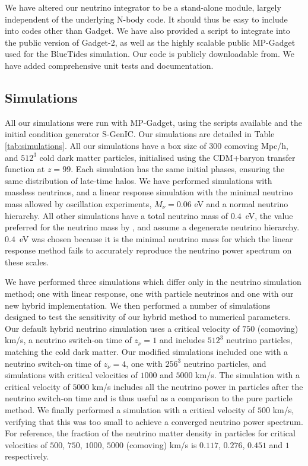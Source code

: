 \documentclass[useAMS, usenatbib]{mnras}
\begin{document}
We have altered our neutrino integrator to be a stand-alone module, largely
independent of the underlying N-body code. It should thus be easy to include
into codes other than Gadget. We have also provided a script to integrate into the
public version of Gadget-2, as well as the highly scalable public MP-Gadget
used for the BlueTides simulation. Our code is publicly downloadable from.
We have added comprehensive unit tests and documentation.

\subsection{Simulations}
\label{sec:simulations}

All our simulations were run with MP-Gadget, using the scripts available
and the initial condition generator S-GenIC. Our simulations are detailed in Table \ref{tab:simulations}.
All our simulations have a box size of $300$ comoving Mpc/h, and $512^3$ cold dark matter particles,
initialised using the CDM+baryon transfer function at $z=99$. Each simulation has the same initial phases,
ensuring the same distribution of late-time halos. We have performed simulations with massless neutrinos, and a linear response simulation with the minimal neutrino mass allowed by oscillation experiments, $M_\nu = 0.06$ eV and a normal neutrino hierarchy. All other simulations have a total neutrino mass of $0.4$~eV, the value preferred for the neutrino mass by \cite{Beutler_2014}, and assume a degenerate neutrino hierarchy. $0.4$~eV was chosen because it is the minimal neutrino mass for which the linear response method fails to accurately reproduce the neutrino power spectrum on these scales.

We have performed three simulations which differ only in the neutrino simulation method; one with linear response, one with particle neutrinos and one with our new hybrid implementation. We then performed a number of simulations designed to test the sensitivity of our hybrid method to numerical parameters. Our default hybrid neutrino simulation uses a critical velocity of $750$ (comoving) km/s, a neutrino switch-on time of $z_\nu = 1$ and includes $512^3$ neutrino particles, matching the cold dark matter. Our modified simulations included one with a neutrino switch-on time of $z_\nu = 4$, one with $256^3$ neutrino particles, and simulations with critical velocities of $1000$ and $5000$ km/s. The simulation with a critical velocity of $5000$ km/s includes all the neutrino power in particles after the neutrino switch-on time and is thus useful as a comparison to the pure particle method. We finally performed a simulation with a critical velocity of $500$ km/s, verifying that this was too small to achieve a converged neutrino power spectrum.
For reference, the fraction of the neutrino matter density in particles for critical velocities of $500$, $750$, $1000$, $5000$ (comoving) km/s is $0.117$, $0.276$, $0.451$ and $1$ respectively.
\end{document}
